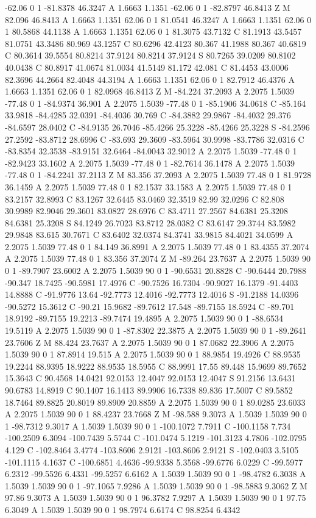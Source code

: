{{{-62.06 0 1 -81.8378 46.3247 A 1.6663 1.1351 -62.06 0 1 -82.8797 46.8413 Z M 82.096 46.8413 A 1.6663 1.1351 62.06 0 1 81.0541 46.3247 A 1.6663 1.1351 62.06 0 1 80.5868 44.1138 A 1.6663 1.1351 62.06 0 1 81.3075 43.7132 C 81.1913 43.5457 81.0751 43.3486 80.969 43.1257 C 80.6296 42.4123 80.367 41.1988 80.367 40.6819 C 80.3614 39.5554 80.8214 37.9124 80.8214 37.9124 S 80.7265 39.0209 80.8102 40.0438 C 80.8917 41.0674 81.0034 41.5149 81.172 42.081 C 81.4453 43.0006 82.3696 44.2664 82.4048 44.3194 A 1.6663 1.1351 62.06 0 1 82.7912 46.4376 A 1.6663 1.1351 62.06 0 1 82.0968 46.8413 Z M -84.224 37.2093 A 2.2075 1.5039 -77.48 0 1 -84.9374 36.901 A 2.2075 1.5039 -77.48 0 1 -85.1906 34.0618 C -85.164 33.9818 -84.4285 32.0391 -84.4036 30.769 C -84.3882 29.9867 -84.4032 29.376 -84.6597 28.0402 C -84.9135 26.7046 -85.4266 25.3228 -85.4266 25.3228 S -84.2596 27.2592 -83.8712 28.6996 C -83.693 29.3609 -83.5964 30.9998 -83.7786 32.0316 C -83.8354 32.3538 -83.9151 32.6464 -84.0043 32.9012 A 2.2075 1.5039 -77.48 0 1 -82.9423 33.1602 A 2.2075 1.5039 -77.48 0 1 -82.7614 36.1478 A 2.2075 1.5039 -77.48 0 1 -84.2241 37.2113 Z M 83.356 37.2093 A 2.2075 1.5039 77.48 0 1 81.9728 36.1459 A 2.2075 1.5039 77.48 0 1 82.1537 33.1583 A 2.2075 1.5039 77.48 0 1 83.2157 32.8993 C 83.1267 32.6445 83.0469 32.3519 82.99 32.0296 C 82.808 30.9989 82.9046 29.3601 83.0827 28.6976 C 83.4711 27.2567 84.6381 25.3208 84.6381 25.3208 S 84.1249 26.7023 83.8712 28.0382 C 83.6147 29.3744 83.5982 29.9848 83.615 30.7671 C 83.6402 32.0374 84.3741 33.9815 84.4021 34.0599 A 2.2075 1.5039 77.48 0 1 84.149 36.8991 A 2.2075 1.5039 77.48 0 1 83.4355 37.2074 A 2.2075 1.5039 77.48 0 1 83.356 37.2074 Z M -89.264 23.7637 A 2.2075 1.5039 90 0 1 -89.7907 23.6002 A 2.2075 1.5039 90 0 1 -90.6531 20.8828 C -90.6444 20.7988 -90.347 18.7425 -90.5981 17.4976 C -90.7526 16.7304 -90.9027 16.1379 -91.4403 14.8888 C -91.9776 13.64 -92.7773 12.4016 -92.7773 12.4016 S -91.2188 14.0396 -90.5272 15.3612 C -90.21 15.9682 -89.7612 17.548 -89.7155 18.5924 C -89.701 18.9192 -89.7155 19.2213 -89.7474 19.4895 A 2.2075 1.5039 90 0 1 -88.6534 19.5119 A 2.2075 1.5039 90 0 1 -87.8302 22.3875 A 2.2075 1.5039 90 0 1 -89.2641 23.7606 Z M 88.424 23.7637 A 2.2075 1.5039 90 0 1 87.0682 22.3906 A 2.2075 1.5039 90 0 1 87.8914 19.515 A 2.2075 1.5039 90 0 1 88.9854 19.4926 C 88.9535 19.2244 88.9395 18.9222 88.9535 18.5955 C 88.9991 17.55 89.448 15.9699 89.7652 15.3643 C 90.4568 14.0421 92.0153 12.4047 92.0153 12.4047 S 91.2156 13.6431 90.6783 14.8919 C 90.1407 16.1413 89.9906 16.7338 89.836 17.5007 C 89.5852 18.7464 89.8825 20.8019 89.8909 20.8859 A 2.2075 1.5039 90 0 1 89.0285 23.6033 A 2.2075 1.5039 90 0 1 88.4237 23.7668 Z M -98.588 9.3073 A 1.5039 1.5039 90 0 1 -98.7312 9.3017 A 1.5039 1.5039 90 0 1 -100.1072 7.7911 C -100.1158 7.734 -100.2509 6.3094 -100.7439 5.5744 C -101.0474 5.1219 -101.3123 4.7806 -102.0795 4.129 C -102.8464 3.4774 -103.8606 2.9121 -103.8606 2.9121 S -102.0403 3.5105 -101.1115 4.1637 C -100.6851 4.4636 -99.9338 5.3568 -99.6776 6.0229 C -99.5977 6.2312 -99.5526 6.4331 -99.5257 6.6162 A 1.5039 1.5039 90 0 1 -98.4782 6.3038 A 1.5039 1.5039 90 0 1 -97.1065 7.9286 A 1.5039 1.5039 90 0 1 -98.5883 9.3062 Z M 97.86 9.3073 A 1.5039 1.5039 90 0 1 96.3782 7.9297 A 1.5039 1.5039 90 0 1 97.75 6.3049 A 1.5039 1.5039 90 0 1 98.7974 6.6174 C 98.8254 6.4342 }}}
